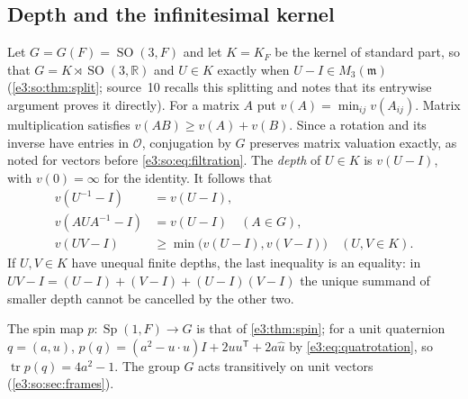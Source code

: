 \documentclass[11pt,letterpaper]{article}
\numberwithin{equation}{section}
\theoremstyle{definition}
\theoremstyle{remark}
\newcommand{\R}{\mathbb R}
\newcommand{\OO}{\mathcal O}
\newcommand{\mm}{\mathfrak m}
\newcommand{\SO}{\operatorname{SO}}
\newcommand{\Sp}{\operatorname{Sp}}
\newcommand{\tr}{\operatorname{tr}}
\newcommand{\transpose}{^{\mathsf T}}
\begin{document}
\subsection{Depth and the infinitesimal kernel}\label{e3:cut:sub:depth}

Let $G=G(F)=\SO(3,F)$ and let $K=K_F$ be the kernel of standard part, so that
$G=K\rtimes\SO(3,\R)$ and $U\in K$ exactly when $U-I\in M_3(\mm)$
(\cref{e3:so:thm:split}; source~10 recalls this splitting and notes that its
entrywise argument proves it directly). For a matrix $A$ put
$v(A)=\min_{ij}v(A_{ij})$. Matrix multiplication satisfies
$v(AB)\ge v(A)+v(B)$. Since a rotation and its inverse have entries in $\OO$,
conjugation by $G$ preserves matrix valuation exactly, as noted for vectors
before \cref{e3:so:eq:filtration}. The \emph{depth} of $U\in K$ is $v(U-I)$, with
$v(0)=\infty$ for the identity. It follows that
\begin{equation}\label{e3:cut:eq:depthbasic}
 \begin{split}
 v(U^{-1}-I)&=v(U-I),\\
 v(AUA^{-1}-I)&=v(U-I)\quad(A\in G),\\
 v(UV-I)&\ge\min\bigl(v(U-I),v(V-I)\bigr)\quad(U,V\in K).
 \end{split}
\end{equation}
If $U,V\in K$ have unequal finite depths, the last inequality is an equality:
in $UV-I=(U-I)+(V-I)+(U-I)(V-I)$ the unique summand of smaller depth cannot be
cancelled by the other two.

The spin map $p:\Sp(1,F)\to G$ is that of \cref{e3:thm:spin}; for a unit
quaternion $q=(a,u)$,
$p(q)=(a^2-u\cdot u)I+2uu\transpose+2a\widehat u$ by \cref{e3:eq:quatrotation},
so $\tr p(q)=4a^2-1$. The group $G$ acts transitively on unit vectors
(\cref{e3:so:sec:frames}).
\end{document}
